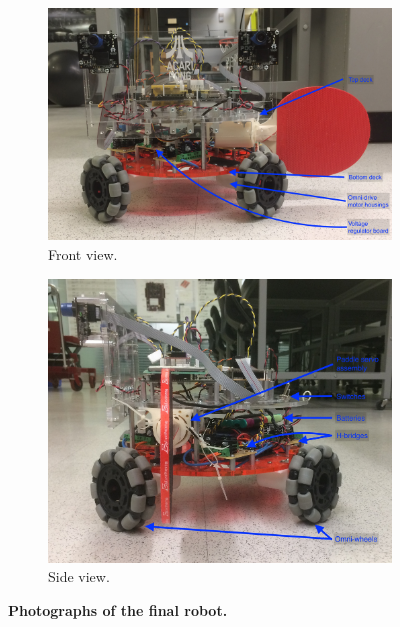 \documentclass[letterpaper, 11pt]{article}
\begin{document}
\begin{figure}[H]\ContinuedFloat
    \centering
    \begin{subfigure}[t]{0.8\textwidth}
        \includegraphics[width=\textwidth]{images/front.JPG}
        \caption{Front view.}
    \end{subfigure}

    \begin{subfigure}[t]{0.8\textwidth}
        \includegraphics[width=\textwidth]{images/left.JPG}
        \caption{Side view.}
    \end{subfigure}
    \caption{\textbf{Photographs of the final robot.}}
    \label{fig:pics}
\end{figure}
\end{document}
